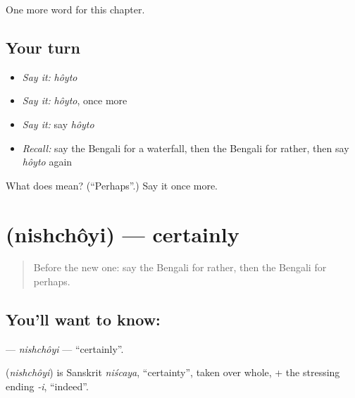 \begin{grammarlens}[title={What you've built}]
One more word for this chapter.
\end{grammarlens}

\subsection*{Your turn}
\begin{itemize}
\raggedright
  \item \emph{Say it:} \emph{hôyto}
  \item \emph{Say it:} \emph{hôyto}, once more
  \item \emph{Say it:} say \emph{hôyto}
  \item \emph{Recall:} say the Bengali for a waterfall, then the Bengali for rather, then say \emph{hôyto} again
\end{itemize}

\begin{tcolorbox}[breakable,colback=teal!4,colframe=teal!35!black,title={Before you move on}]
What does  mean? (\textquotedblleft{}Perhaps\textquotedblright{}.) Say it once more.
\end{tcolorbox}
\section[\texorpdfstring{\bn{নিশ্চয়ই} (nishchôyi)}{নিশ্চয়ই (nishchôyi)}]{ (nishchôyi) — certainly}

\label{lesson:BN-C190-nishchoyi}



\begin{quote}
Before the new one: say the Bengali for rather, then the Bengali for perhaps.
\end{quote}

\subsection*{You'll want to know: }
\textbf{} — \emph{nishchôyi} — \textquotedblleft{}certainly\textquotedblright{}.

\begin{cousinweb}
\textbf{} (\emph{nishchôyi}) is Sanskrit \emph{niścaya}, \textquotedblleft{}certainty\textquotedblright{}, taken over whole, + the stressing ending \emph{-i}, \textquotedblleft{}indeed\textquotedblright{}.
\end{cousinweb}

